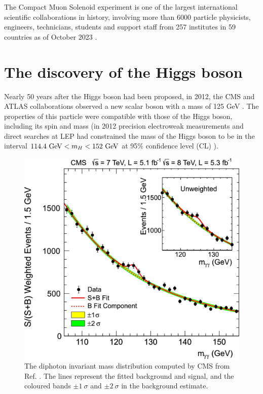 The Compact Muon Solenoid experiment is one of the largest international scientific collaborations in history, involving more than 6000 particle physicists, engineers, technicians, students and support staff from 257 institutes in 59 countries as of October 2023 \cite{CERN:CMS_people}.

\section{The discovery of the Higgs boson}\label{sec:Higgs_discovery}

Nearly 50 years after the Higgs boson had been proposed, in 2012, the CMS and ATLAS collaborations observed a new scalar boson with a mass of 125 GeV \cite{CMS:2012qbp, ATLAS:2012yve}. The properties of this particle were compatible with those of the Higgs boson, including its spin and mass (in 2012 precision electroweak measurements and direct searches at LEP had constrained the mass of the Higgs boson to be in the interval $114.4\ \GeV < m_H < 152\ \GeV$ at 95\% confidence level (CL) \cite{ALEPH:2010aa, LEPWorkingGroupforHiggsbosonsearches:2003ing}).

\begin{figure}[!ht]
    \vspace*{-0.0cm}
    \centering
    \setlength{\mylength}{\textwidth}
    \includegraphics[width=0.60\mylength]{resources/CMS_Higgs_diphoton.jpg}
    \vspace*{-0.0cm}
    \caption{The diphoton invariant mass distribution computed by CMS from Ref. \cite{CMS:2012qbp}. The lines represent the fitted background and signal, and the coloured bands $\pm1\ \sigma$ and $\pm2\ \sigma$ in the background estimate.}
    \label{fig:CMS_Higgs_diphoton}
    \vspace*{-0.3cm}
\end{figure}

